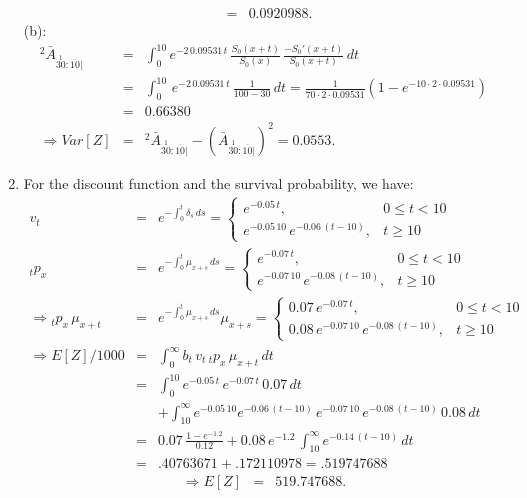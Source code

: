\documentclass[11pt,fleqn,oneside]{book}
\begin{document}
\begin{enumerate}
\begin{eqnarray*}
&=&0.0920988.
\end{eqnarray*}
(b): 
\begin{eqnarray*}
{^2\bar{A}_{\stackrel{1}{30}:\overline{10}|}} &=& \int_0^{10} e^{-2\,0.09531\,t}\,\frac{S_0(x+t)}{S_0(x)}\,\frac{-S_0'(x+t)}{S_0(x+t)}\,dt\\
&=& \int_0^{10} \,e^{-2\,0.09531\,t}\,\frac{1}{100-30}\,dt = \frac{1}{70 \cdot 2 \cdot 0.09531} \left(1 - e^{-10 \cdot 2 \cdot 0.09531}\right)\\
&=&0.66380\\
\Rightarrow Var[Z] &=& {^2\bar{A}_{\stackrel{1}{30}:\overline{10}|}}  - \left({\bar{A}_{\stackrel{1}{30}:\overline{10}|}} \right)^2 = 0.0553.
\end{eqnarray*} 
\item For the discount function and the survival probability, we have:
\begin{eqnarray*}
v_t &=& e^{-\int_0^t \delta_s\,ds} = \left\{
\begin{array}{cl}
e^{-0.05\,t},&0\leq t < 10\\
e^{-0.05\,10}\,e^{-0.06\,(t-10)},& t\geq 10
\end{array}
\right. \\
{_tp_x} &=& e^{-\int_0^t \mu_{x+s}\,ds} = \left\{
\begin{array}{cl}
e^{-0.07\,t},&0\leq t < 10\\
e^{-0.07\,10}\,e^{-0.08\,(t-10)},& t\geq 10
\end{array}
\right.\\
\Rightarrow {_tp_x}\,\mu_{x+t} &=& e^{-\int_0^t \mu_{x+s}\,ds} \mu_{x+s} = \left\{
\begin{array}{cl}
0.07\,e^{-0.07\,t},&0\leq t < 10\\
0.08\,e^{-0.07\,10}\,e^{-0.08\,(t-10)},& t\geq 10
\end{array}
\right.\\
\Rightarrow
E[Z]/1000 &=& \int_0^\infty b_t\,v_t\,{_tp_x}\,\mu_{x+t}\,dt\\
&=& \int_0^{10} e^{-0.05\,t}\,e^{-0.07\,t}\,0.07\,dt \\&&
+ \int_{10}^{\infty} e^{-0.05\,10} e^{-0.06\,(t-10)}\,e^{-0.07\,10} \,e^{-0.08\,(t-10)}\,0.08\,dt\\
&=& 0.07\,\frac{1 - e^{-1.2}}{0.12} + 0.08\,e^{-1.2}\, \int_{10}^\infty e^{-0.14 \,(t-10)} \,dt \\
&=& .40763671 + .172110978 = .519747688
\end{eqnarray*}
\begin{eqnarray*}
\Rightarrow E[Z] &=& 519.747688.

\end{eqnarray*}
\end{enumerate}
\end{document}
